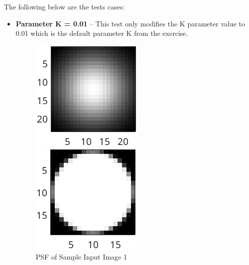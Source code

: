 \documentclass{article}
\begin{document}
	The following below are the tests cases:
	\begin{itemize}
  	\item \textbf{Parameter K = 0.01} – This test only modifies the K parameter value to 0.01 which is the default parameter K from the exercise.

			\begin{figure}[ht]
  			\centering
  			\begin{minipage}[t]{0.40\textwidth}
    			\centering
    			\includegraphics[width=\textwidth]{2AE1PSF}
    			\caption{PSF of Sample Input Image 1}
    			\label{fig:psf1}
  			\end{minipage}\hfill
  			\begin{minipage}[t]{0.40\textwidth}
    			\centering
    			\includegraphics[width=\textwidth]{2AE2PSF}

\end{minipage}
\end{figure}
\end{itemize}
\end{document}
